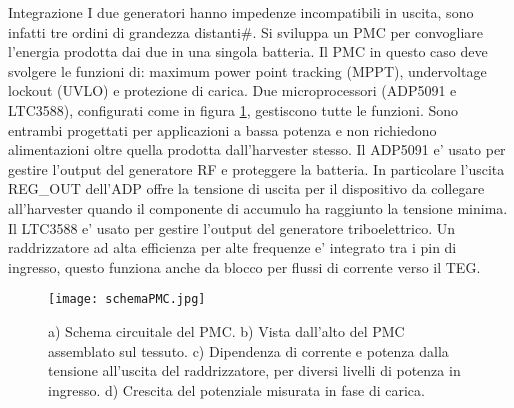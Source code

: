 \begin{section}{Integrazione}
    I due generatori hanno impedenze incompatibili in uscita, sono infatti tre ordini di grandezza distanti\#. Si sviluppa un PMC per convogliare l'energia prodotta dai due in una singola batteria. Il PMC in questo caso deve svolgere le funzioni di: maximum power point tracking (MPPT), undervoltage lockout (UVLO) e protezione di carica. Due microprocessori (ADP5091 e LTC3588), configurati come in figura \ref{fig:schemaPMC}, gestiscono tutte le funzioni. Sono entrambi progettati per applicazioni a bassa potenza e non richiedono alimentazioni oltre quella prodotta dall'harvester stesso. Il ADP5091 e' usato per gestire l'output del generatore RF e proteggere la batteria. In particolare l'uscita REG\_OUT dell'ADP offre la tensione di uscita per il dispositivo da collegare all'harvester quando il componente di accumulo ha raggiunto la tensione minima. Il LTC3588 e' usato per gestire l'output del generatore triboelettrico. Un raddrizzatore ad alta efficienza per alte frequenze e' integrato  tra i pin di ingresso, questo funziona anche da blocco per flussi di corrente verso il TEG.

    \begin{figure}[hbt!]
        \texttt{[image: schemaPMC.jpg]}
        \centering
        \caption{a) Schema circuitale del PMC. b) Vista dall'alto del PMC assemblato sul tessuto. c) Dipendenza di corrente e potenza dalla tensione all'uscita del raddrizzatore, per diversi livelli di potenza in ingresso. d) Crescita del potenziale misurata in fase di carica.\cite{kouWearableAllFabricHybrid2024}}
        \label{fig:schemaPMC}
    \end{figure}


\end{section}
